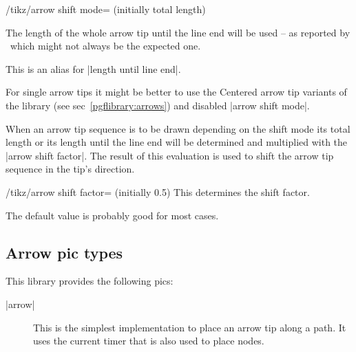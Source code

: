 \begin{multicols}{2}
\begin{key}{/tikz/arrow shift mode= (initially total length)}
\begin{description}
  The length of the whole arrow tip until the line end will be used --
  as reported by \pgfname\ which might not always be the expected one.
\item[|arrow shift mode|=\declare{|line end|}]

  This is an alias for |length until line end|.
\end{description}

For single arrow tips it might be better to use the Centered arrow tip variants
of the  library (see sec~\ref{pgflibrary:arrows})
and disabled |arrow shift mode|.
\end{key}

When an arrow tip sequence is to be drawn depending on the shift mode
its total length or its length until the line end will be determined
and multiplied with the |arrow shift factor|.
The result of this evaluation is used to shift the arrow tip sequence
in the tip's direction.

\begin{key}{/tikz/arrow shift factor= (initially 0.5)}
  This determines the shift factor.
  
  The default value is probably good for most cases.
\end{key}
\begin{codeexample}[preamble=\usetikzlibrary{ext.arrows-plus}]
\end{codeexample}

\subsection{Arrow pic types}

This library provides the following pics:
\begin{description}
\item[|arrow|]
  This is the simplest implementation to place an arrow tip along a path.
  It uses the current timer that is also used to place nodes.
  

\end{description}
\end{multicols}
